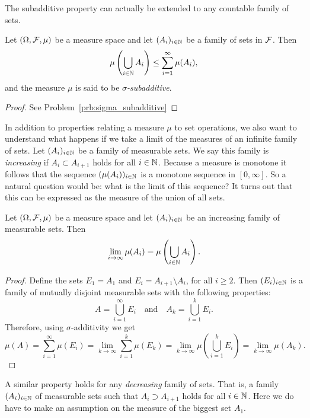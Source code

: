 The subadditive property can actually be extended to any countable family of sets.

\begin{lemma}\label{lem:sigma_subadditive}
Let $(\Omega, \mathcal F, \mu)$ be a measure space and let $(A_i)_{i \in \mathbb N}$ be a family of sets in $\mathcal F$. Then
\[
	\mu\left(\bigcup_{i \in \mathbb N} A_i\right) \le \sum_{i = 1}^\infty \mu(A_i),
\]
and the measure $\mu$ is said to be \emph{$\sigma$-subadditive}.
\end{lemma}

\begin{proof}
See Problem~\ref{prb:sigma_subadditive}
\end{proof}

In addition to properties relating a measure $\mu$ to set operations, we also want to understand what happens if we take a limit of the measures of an infinite family of sets. Let $(A_i)_{i \in \mathbb N}$ be a family of measurable sets. We say this family is \emph{increasing} if $A_i \subset A_{i+1}$ holds for all $i \in \mathbb N$. Because a measure is monotone it follows that the sequence $(\mu(A_i))_{i \in \mathbb N}$ is a monotone sequence in $[0,\infty]$. So a natural question would be: what is the limit of this sequence? It turns out that this can be expressed as the measure of the union of all sets.

\begin{proposition}\label{prop:continuity_measure_below}
Let $(\Omega, \mathcal F, \mu)$ be a measure space and let $(A_i)_{i \in \mathbb N}$ be an increasing family of measurable sets. Then
\[
	\lim_{i \to \infty} \mu(A_i) = \mu\left(\bigcup_{i \in \mathbb N} A_i\right).
\]
\end{proposition}

\begin{proof}
Define the sets $E_1 = A_1$ and $E_i = A_{i+1}\setminus A_i$, for all $i \ge 2$. Then $(E_i)_{i \in \mathbb N}$ is a family of mutually disjoint measurable sets with the following properties:
\[
	A = \bigcup_{i = 1}^\infty E_i \quad \text{and} \quad A_k = \bigcup_{i = 1}^k E_i.
\]
Therefore, using $\sigma$-additivity we get
\[
	\mu(A) = \sum_{i = 1}^\infty \mu(E_i) = \lim_{k \to \infty} \sum_{i = 1}^k \mu(E_k)
	= \lim_{k \to \infty} \mu(\bigcup_{i = 1}^k E_i) = \lim_{k \to \infty} \mu(A_k).
\]
\end{proof}

A similar property holds for any \emph{decreasing} family of sets. That is, a family $(A_i)_{i \in \mathbb N}$ of measurable sets such that $A_i \supset A_{i+1}$ holds for all $i \in \mathbb N$. Here we do have to make an assumption on the measure of the biggest set $A_1$.

